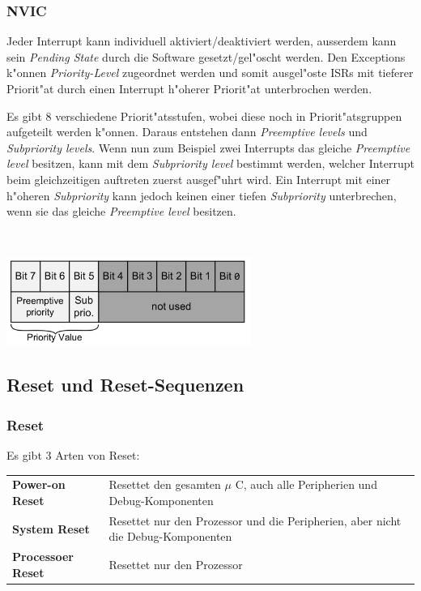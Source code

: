 \subsubsection{NVIC}
Jeder Interrupt kann individuell aktiviert/deaktiviert werden, ausserdem kann sein \textit{Pending State} durch die Software gesetzt/gel"oscht werden. Den Exceptions k"onnen \textit{Priority-Level} zugeordnet werden und somit ausgel"oste ISRs mit tieferer Priorit"at durch einen Interrupt h"oherer Priorit"at unterbrochen werden. 

\begin{minipage}{10cm}
	Es gibt 8 verschiedene Priorit"atsstufen, wobei diese noch in Priorit"atsgruppen aufgeteilt werden k"onnen. Daraus entstehen dann \textit{Preemptive levels} und \textit{Subpriority levels}. Wenn nun zum Beispiel zwei Interrupts das gleiche \textit{Preemptive level} besitzen, kann mit dem \textit{Subpriority level} bestimmt werden, welcher Interrupt beim gleichzeitigen auftreten zuerst ausgef"uhrt wird. Ein Interrupt mit einer h"oheren \textit{Subpriority} kann jedoch keinen einer tiefen \textit{Subpriority} unterbrechen, wenn sie das gleiche \textit{Preemptive level} besitzen.
\end{minipage}
%
\begin{minipage}{0.25cm}
	\-\
\end{minipage}
%
\begin{minipage}{8cm}
	\includegraphics[width=8cm]{images/prioritaetsstufen}
\end{minipage}

\subsection{Reset und Reset-Sequenzen}
\subsubsection{Reset}
Es gibt 3 Arten von Reset:\\
\begin{tabular}{ll}
    \textbf{Power-on Reset}  & Resettet den gesamten $\mu$ C, auch alle Peripherien und Debug-Komponenten \\ 
    \textbf{System Reset}    & Resettet nur den Prozessor und die Peripherien, aber nicht die Debug-Komponenten \\ 
    \textbf{Processoer Reset} & Resettet nur den Prozessor\\
\end{tabular}

